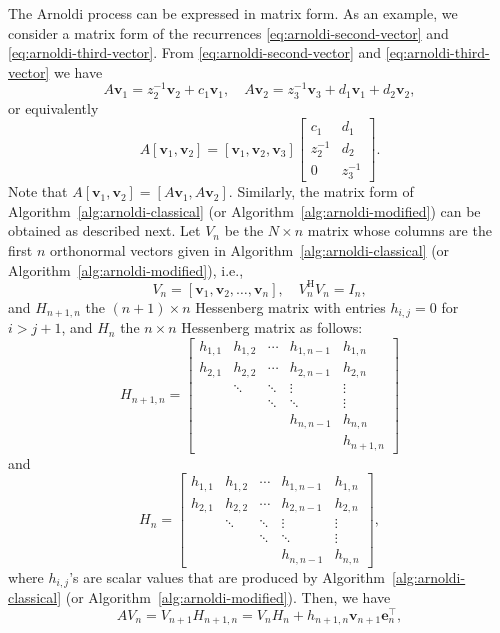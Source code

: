 {The Arnoldi process can be expressed in matrix form. As an example, we consider a matrix form of the recurrences \eqref{eq:arnoldi-second-vector} and \eqref{eq:arnoldi-third-vector}. From \eqref{eq:arnoldi-second-vector} and \eqref{eq:arnoldi-third-vector} we have}
\[A\bm v_1=z_2^{-1}\bm v_2+c_1\bm v_1,\quad
A\bm v_2=z_3^{-1}\bm v_3+d_1\bm v_1+d_2\bm v_2,\]
{or equivalently}
\[
A[\bm v_1,\bm v_2]=[\bm v_1,\bm v_2,\bm v_3]
\begin{bmatrix}c_1&d_1\\z_2^{-1}&d_2\\0&z_3^{-1}\end{bmatrix}.
\]
{Note that $A[\bm v_1,\bm v_2]=[A\bm v_1,A\bm v_2]$. Similarly, the matrix form of Algorithm~\ref{alg:arnoldi-classical} (or Algorithm~\ref{alg:arnoldi-modified}) can be obtained as described next.}
{Let $V_n$ be the $N\times n$ matrix whose columns are the first $n$ orthonormal vectors given in Algorithm~\ref{alg:arnoldi-classical} (or Algorithm~\ref{alg:arnoldi-modified}), i.e.,}
\[V_n=[\bm v_1,\bm v_2,\ldots,\bm v_n],\quad V_n^{\mathrm H}V_n=I_n,\]
{and $H_{n+1,n}$ the $(n+1)\times n$ Hessenberg matrix with entries $h_{i,j}=0$ for $i>j+1$, and $H_n$ the $n\times n$ Hessenberg matrix as follows:}
\[
H_{n+1,n}=\begin{bmatrix}
h_{1,1}&h_{1,2}&\cdots&h_{1,n-1}&h_{1,n}\\
h_{2,1}&h_{2,2}&\cdots&h_{2,n-1}&h_{2,n}\\
&\ddots&\ddots&\vdots&\vdots\\
&&\ddots&\ddots&\vdots\\
&&&h_{n,n-1}&h_{n,n}\\
&&&&h_{n+1,n}
\end{bmatrix}
\]
{and}
\[
H_n=\begin{bmatrix}
h_{1,1}&h_{1,2}&\cdots&h_{1,n-1}&h_{1,n}\\
h_{2,1}&h_{2,2}&\cdots&h_{2,n-1}&h_{2,n}\\
&\ddots&\ddots&\vdots&\vdots\\
&&\ddots&\ddots&\vdots\\
&&&h_{n,n-1}&h_{n,n}
\end{bmatrix},
\]
{where $h_{i,j}$'s are scalar values that are produced by Algorithm~\ref{alg:arnoldi-classical} (or Algorithm~\ref{alg:arnoldi-modified}). Then, we have}
\begin{equation}\label{eq:arnoldi-matrix-relation}
AV_n=V_{n+1}H_{n+1,n}=V_nH_n+h_{n+1,n}\bm v_{n+1}\bm e_n^\top,
\end{equation}
